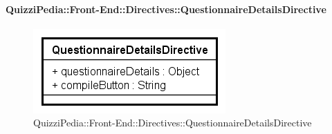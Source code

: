 \paragraph{QuizziPedia::Front-End::Directives::QuestionnaireDetailsDirective}

\label{QuizziPedia::Front-End::Directives::QuestionnaireDetailsDirective}

\begin{figure}[ht]
	\centering
	\includegraphics[scale=0.80,keepaspectratio]{UML/Classi/Front-End/QuizziPedia_Front-end_Directives_QuestionnaireDetailsDirective.png}
	\caption{QuizziPedia::Front-End::Directives::QuestionnaireDetailsDirective}
\end{figure} 
\FloatBarrier

